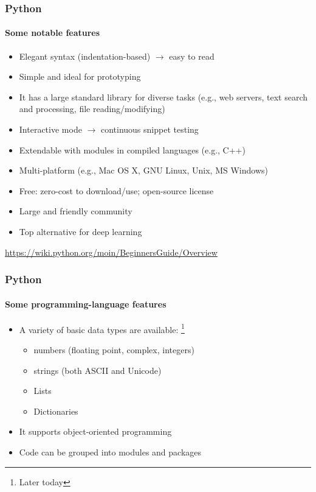 \documentclass[xcolor=x11names,handout]{beamer}
\newcommand{\light}[1]{\textcolor{gray}{#1}}
\begin{document}
\begin{frame}
\frametitle{Python}
\framesubtitle{Some notable features}

\begin{itemize}
\item Elegant syntax (indentation-based) $\rightarrow$ easy to read	\pause 
\item Simple and ideal for prototyping	\pause 
\item It has a large standard library for diverse tasks (e.g., web servers, 
text search and processing, file reading/modifying)	\pause 
\item Interactive mode $\rightarrow$ continuous snippet testing	\pause 
\item Extendable with modules in compiled languages (e.g., C++)	\pause 
\item Multi-platform (e.g., Mac OS X, GNU Linux, Unix, MS Windows)	\pause 
\item Free: zero-cost to download/use; open-source license	\pause 
\item Large and friendly community		\pause 
\item Top alternative for deep learning
\end{itemize}
\bigskip 

\onslide 
\light{\url{https://wiki.python.org/moin/BeginnersGuide/Overview}}
\end{frame}

\begin{frame}
\frametitle{Python}
\framesubtitle{Some programming-language features}

\begin{itemize}
\item A variety of basic data types are available:%
\footnote{Later today}
\begin{itemize}
 \item numbers (floating point, complex, integers)
 \item strings (both ASCII and Unicode)
 \item Lists
 \item Dictionaries
\end{itemize}		\bigskip	\pause 
 
\item It supports object-oriented programming	\bigskip

\item Code can be grouped into modules and packages
\end{itemize}
\end{frame}
\end{document}
